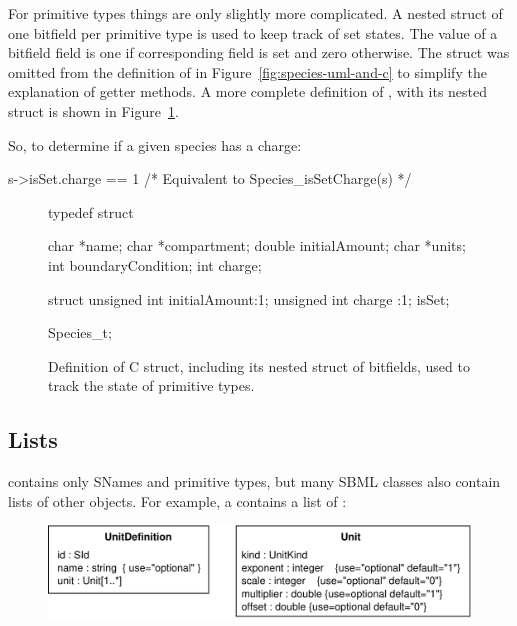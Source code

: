 \documentclass{cekmanual}
\begin{document}
For primitive types things are only slightly more complicated.  A
nested  struct of one bitfield per primitive type is
used to keep track of set states.  The value of a bitfield field is
one if corresponding field is set and zero otherwise.  The
 struct was omitted from the definition of
 in Figure~\ref{fig:species-uml-and-c} to simplify
the explanation of getter methods.  A more complete definition of
, with its  nested struct is shown
in Figure~\ref{fig:species-isSet}.


So, to determine if a given species  has a charge:

\begin{example}
  s->isSet.charge == 1  /* Equivalent to Species_isSetCharge(s) */
\end{example}


\begin{figure}[bth]
  \begin{codeVerbatim}[C,flexiblecolumns=false]
typedef struct
{
  char    *name;
  char    *compartment;
  double  initialAmount;
  char    *units;
  int     boundaryCondition;
  int     charge;

  struct
  {
    unsigned int initialAmount:1;
    unsigned int charge       :1;
  } isSet;

} Species_t;
  \end{codeVerbatim}
  \caption{Definition of  C struct, including its
  nested  struct of bitfields, used to track the state
  of primitive types.}
  \label{fig:species-isSet}
\end{figure}


\subsection{Lists}
\label{sec:lists}

 contains only SNames and primitive types, but many
SBML classes also contain lists of other objects.  For example, a
 contains a list of :


\begin{figure}[h]
  \centering
  \includegraphics[scale=0.68]{unitdefinition}
  \label{fig:unit-definition}
\end{figure}
\end{document}
